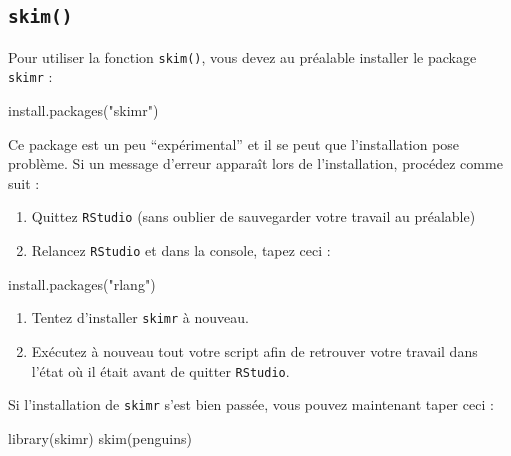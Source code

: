 \documentclass[
  letterpaper,
  DIV=11,
  numbers=noendperiod]{scrreprt}
\newenvironment{Shaded}{\begin{snugshade}}{\end{snugshade}}
\newcommand{\FunctionTok}[1]{\textcolor[rgb]{0.28,0.35,0.67}{#1}}
\newcommand{\NormalTok}[1]{\textcolor[rgb]{0.00,0.23,0.31}{#1}}
\newcommand{\StringTok}[1]{\textcolor[rgb]{0.13,0.47,0.30}{#1}}
\providecommand{\tightlist}{%
  \setlength{\itemsep}{0pt}\setlength{\parskip}{0pt}}\usepackage{longtable,booktabs,array}
\begin{document}
\hypertarget{skim}{%
\subsection{\texorpdfstring{\texttt{skim()}}{skim()}}\label{skim}}

Pour utiliser la fonction \texttt{skim()}, vous devez au préalable
installer le package \texttt{skimr} :

\begin{Shaded}
\begin{Highlighting}[]
\FunctionTok{install.packages}\NormalTok{(}\StringTok{"skimr"}\NormalTok{)}
\end{Highlighting}
\end{Shaded}

Ce package est un peu ``expérimental'' et il se peut que l'installation
pose problème. Si un message d'erreur apparaît lors de l'installation,
procédez comme suit :

\begin{enumerate}
\def\labelenumi{\arabic{enumi}.}
\tightlist
\item
  Quittez \texttt{RStudio} (sans oublier de sauvegarder votre travail au
  préalable)
\item
  Relancez \texttt{RStudio} et dans la console, tapez ceci :
\end{enumerate}

\begin{Shaded}
\begin{Highlighting}[]
\FunctionTok{install.packages}\NormalTok{(}\StringTok{"rlang"}\NormalTok{)}
\end{Highlighting}
\end{Shaded}

\begin{enumerate}
\def\labelenumi{\arabic{enumi}.}
\setcounter{enumi}{2}
\tightlist
\item
  Tentez d'installer \texttt{skimr} à nouveau.
\item
  Exécutez à nouveau tout votre script afin de retrouver votre travail
  dans l'état où il était avant de quitter \texttt{RStudio}.
\end{enumerate}

Si l'installation de \texttt{skimr} s'est bien passée, vous pouvez
maintenant taper ceci :

\begin{Shaded}
\begin{Highlighting}[]
\FunctionTok{library}\NormalTok{(skimr)}
\FunctionTok{skim}\NormalTok{(penguins)}
\end{Highlighting}
\end{Shaded}
\end{document}
